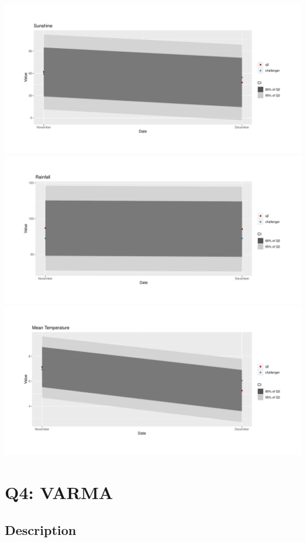 \documentclass[
  11pt,
]{article}
\begin{document}
\includegraphics{ST422_files/figure-latex/unnamed-chunk-45-1.pdf}
\includegraphics{ST422_files/figure-latex/unnamed-chunk-46-1.pdf}
\includegraphics{ST422_files/figure-latex/unnamed-chunk-47-1.pdf}

\newpage

\hypertarget{q4-varma}{%
\section{Q4: VARMA}\label{q4-varma}}

\hypertarget{description-1}{%
\subsection{Description}\label{description-1}}
\end{document}
